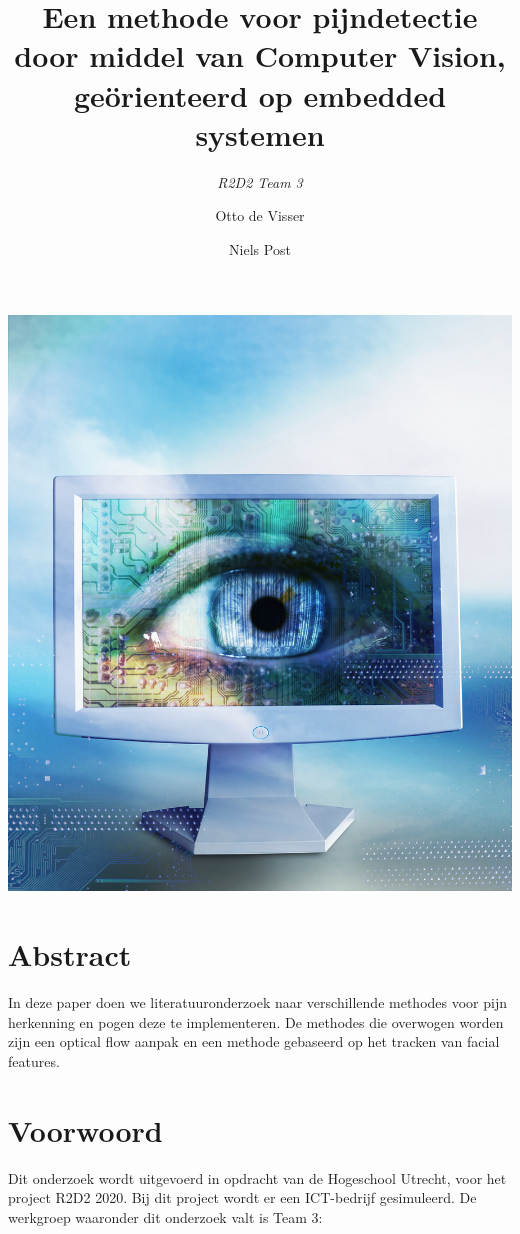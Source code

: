 \documentclass[11pt]{article}
\title{Een methode voor pijndetectie door middel van Computer Vision, ge\"{o}rienteerd op embedded systemen}
\author{\emph{R2D2 Team 3} \and Otto de Visser \and Niels Post}
\begin{document}
    \begin{titlepage}
        \centering
        \maketitle
        \includegraphics[height=0.6\textheight]{Images/vision.jpg}
        \clearpage
    \end{titlepage}


    \clearpage
    \tableofcontents

    \clearpage

    \section{Abstract}\label{sec:abstract}
    In deze paper doen we literatuuronderzoek naar verschillende methodes voor pijn herkenning en pogen deze te implementeren.
    De methodes die overwogen worden zijn een optical flow aanpak en een methode gebaseerd op het tracken van facial features.

    \section{Voorwoord}\label{sec:voorwoord}
    Dit onderzoek wordt uitgevoerd in opdracht van de Hogeschool Utrecht, voor het project R2D2 2020.
    Bij dit project wordt er een ICT-bedrijf gesimuleerd.
    De werkgroep waaronder dit onderzoek valt is Team 3:\\
    \\
\end{document}
